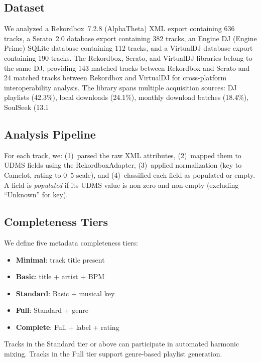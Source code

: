 \documentclass[letterpaper,10pt]{article}
\begin{document}
\subsection{Dataset}

We analyzed a Rekordbox~7.2.8 (AlphaTheta) XML export containing 636 tracks, a Serato~2.0 database export containing 382 tracks, an Engine DJ (Engine Prime) SQLite database containing 112 tracks, and a VirtualDJ database export containing 190 tracks. The Rekordbox, Serato, and VirtualDJ libraries belong to the same DJ, providing 143 matched tracks between Rekordbox and Serato and 24 matched tracks between Rekordbox and VirtualDJ for cross-platform interoperability analysis. The library spans multiple acquisition sources: DJ playlists (42.3\%), local downloads (24.1\%), monthly download batches (18.4\%), SoulSeek (13.1%

\subsection{Analysis Pipeline}

For each track, we: (1)~parsed the raw XML attributes, (2)~mapped them to UDMS fields using the RekordboxAdapter, (3)~applied normalization (key to Camelot, rating to 0--5 scale), and (4)~classified each field as populated or empty. A field is \emph{populated} if its UDMS value is non-zero and non-empty (excluding ``Unknown'' for key).

\subsection{Completeness Tiers}

We define five metadata completeness tiers:
\begin{itemize}
  \item \textbf{Minimal}: track title present
  \item \textbf{Basic}: title + artist + BPM
  \item \textbf{Standard}: Basic + musical key
  \item \textbf{Full}: Standard + genre
  \item \textbf{Complete}: Full + label + rating
\end{itemize}
Tracks in the Standard tier or above can participate in automated harmonic mixing. Tracks in the Full tier support genre-based playlist generation.
\end{document}
